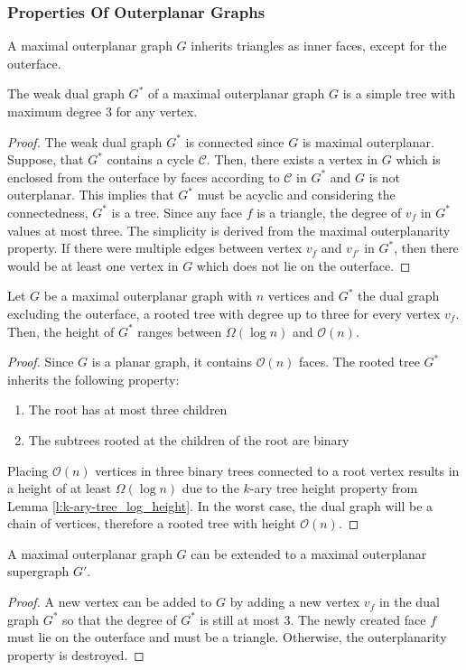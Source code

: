 \subsubsection{Properties Of Outerplanar Graphs}
\begin{lemma}
	A maximal outerplanar graph $G$ inherits triangles as inner faces, except for the outerface.
\end{lemma}
\begin{lemma}\label{l:outerplanar-dual-tree-degree-3}
	The weak dual graph $G^*$ of a maximal outerplanar graph $G$ is a simple tree with maximum degree 3 for any vertex.
\end{lemma}
\begin{proof}
	The weak dual graph $G^*$ is connected since $G$ is maximal outerplanar. Suppose, that $G^*$ contains a cycle $\mathcal{C}$. Then, there exists a vertex in $G$ which is enclosed from the outerface by faces according to $\mathcal{C}$ in $G^*$ and $G$ is not outerplanar. This implies that $G^*$ must be acyclic and considering the connectedness, $G^*$ is a tree. Since any face $f$ is a triangle, the degree of $v_f$ in $G^*$ values at most three. The simplicity is derived from the maximal outerplanarity property. If there were multiple edges between vertex $v_f$ and $v_{f'}$ in $G^*$, then there would be at least one vertex in $G$ which does not lie on the outerface.
\end{proof}
\begin{lemma}
	Let $G$ be a maximal outerplanar graph with $n$ vertices and $G^*$ the dual graph excluding the outerface, a rooted tree with degree up to three for every vertex $v_f$. Then, the height of $G^*$ ranges between $\Omega(\log n)$ and $\mathcal{O}(n)$.
\end{lemma}
\begin{proof}
	Since $G$ is a planar graph, it contains $\mathcal{O}(n)$ faces. The rooted tree $G^*$ inherits the following property:
	\begin{enumerate}
		\item The root has at most three children
		\item The subtrees rooted at the children of the root are binary
	\end{enumerate}
	Placing $\mathcal{O}(n)$ vertices in three binary trees connected to a root vertex results in a height of at least $\Omega(\log n)$ due to the $k$-ary tree height property from Lemma \ref{l:k-ary-tree_log_height}. In the worst case, the dual graph will be a chain of vertices, therefore a rooted tree with height $\mathcal{O}(n)$.
\end{proof}
\begin{lemma}
	A maximal outerplanar graph $G$ can be extended to a maximal outerplanar supergraph $G'$.\label{l:outerplanar-supergraph}
\end{lemma}
\begin{proof}
	A new vertex can be added to $G$ by adding a new vertex $v_f$ in the dual graph $G^*$ so that the degree of $G^*$ is still at most 3. The newly created face $f$ must lie on the outerface and must be a triangle. Otherwise, the outerplanarity property is destroyed.
\end{proof}

